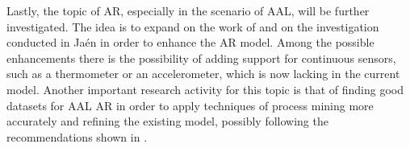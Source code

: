   Lastly, the topic of \ac{AR}, especially in the scenario of \ac{AAL}, will be further investigated. The idea is to expand on the work of \cite{biagi2016stochastic,carnevali2015continuous} and on the investigation conducted in Jaén in order to enhance the \ac{AR} model. Among the possible enhancements there is the possibility of adding support for continuous sensors, such as a thermometer or an accelerometer, which is now lacking in the current model. Another important research activity for this topic is that of finding good datasets for \ac{AAL} \ac{AR} in order to apply techniques of process mining more accurately and refining the existing model, possibly following the recommendations shown in \cite{patara2015recommendations}.

\newpage
